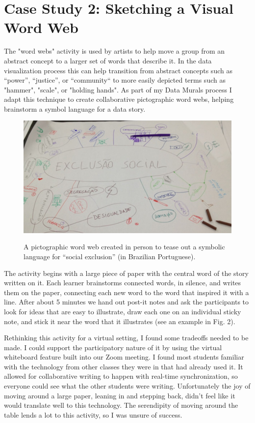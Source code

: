 \documentclass[journal]{vgtc}                %
\begin{document}
\section{Case Study 2: Sketching a Visual Word Web}
The "word webs" activity is used by artists to help move a group from an abstract concept to a larger set of words that describe it. In the data visualization process this can help transition from abstract concepts such as “power”, “justice”, or “community“ to more easily depicted terms such as "hammer", "scale", or "holding hands". As part of my Data Murals process I adapt this technique to create collaborative pictographic word webs, helping brainstorm a symbol language for a data story\cite{bhargava_data_2016}.

\begin{figure}[h]
  \centering
  \includegraphics[scale=0.26]{figures/figure2.jpg}
  \label{fig:full_word_web}
  \caption{A pictographic word web created in person to tease out a symbolic language for “social exclusion” (in Brazilian Portuguese).}
\end{figure}

The activity begins with a large piece of paper with the central word of the story written on it. Each learner brainstorms connected words, in silence, and writes them on the paper, connecting each new word to the word that inspired it with a line. After about 5 minutes we hand out post-it notes and ask the participants to look for ideas that are easy to illustrate, draw each one on an individual sticky note, and stick it near the word that it illustrates (see an example in Fig. 2).

Rethinking this activity for a virtual setting, I found some tradeoffs needed to be made. I could support the participatory nature of it by using the virtual whiteboard feature built into our Zoom meeting. I found most students familiar with the technology from other classes they were in that had already used it. It allowed for collaborative writing to happen with real-time synchronization, so everyone could see what the other students were writing. Unfortunately the joy of moving around a large paper, leaning in and stepping back, didn't feel like it would translate well to this technology. The serendipity of moving around the table lends a lot to this activity, so I was unsure of success.
\end{document}
